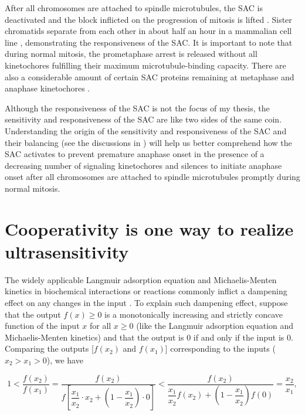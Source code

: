 After all chromosomes are attached to spindle microtubules, the SAC is deactivated and the block inflicted on the progression of mitosis is lifted \cite{PP2A-B56, DyneinStripsCorona, BubR1MitosisTurnover, CCT-MCCDisassembly, Ubiquitylation-MCCDisassembly, UBR5-MCCDisassembly, TRIP13-p31-MAD2, APC-SUMO}. Sister chromatids separate from each other in about half an hour in a mammalian cell line \cite{RiederNormalProgression}, demonstrating the responsiveness of the SAC. It is important to note that during normal mitosis, the prometaphase arrest is released without all kinetochores fulfilling their maximum microtubule-binding capacity. There are also a considerable amount of certain SAC proteins remaining at metaphase and anaphase kinetochores \cite{SACSilencing_Etemad2019, SACSilencing_Kuhn2019}.

Although the responsiveness of the SAC is not the focus of my thesis, the sensitivity and responsiveness of the SAC are like two sides of the same coin. Understanding the origin of the sensitivity and responsiveness of the SAC and their balancing (see the discussions in ) will help us better comprehend how the SAC activates to prevent premature anaphase onset in the presence of a decreasing number of signaling kinetochores and silences to initiate anaphase onset after all chromosomes are attached to spindle microtubules promptly during normal mitosis.

\section{Cooperativity is one way to realize ultrasensitivity}

The widely applicable Langmuir adsorption equation and Michaelis-Menten kinetics in biochemical interactions or reactions commonly inflict a dampening effect on any changes in the input \cite{CooperativityQA}. To explain such dampening effect, suppose that the output $f(x) \geq 0$ is a monotonically increasing and strictly concave function of the input $x$ for all $x \geq 0$ (like the Langmuir adsorption equation and Michaelis-Menten kinetics) and that the output is 0 if and only if the input is 0. Comparing the outputs [$f(x_2)$ and $f(x_1)$] corresponding to the inputs ($x_2 > x_1 > 0$), we have

\begin{equation*}
    1 < \dfrac{f(x_2)}{f(x_1)} = \dfrac{f(x_2)}{f[\dfrac{x_1}{x_2} \cdot x_2 + (1-\dfrac{x_1}{x_2}) \cdot 0]} < \dfrac{f(x_2)}{\dfrac{x_1}{x_2}f(x_2) + (1-\dfrac{x_1}{x_2})f(0)} = \dfrac{x_2}{x_1},
\end{equation*}


